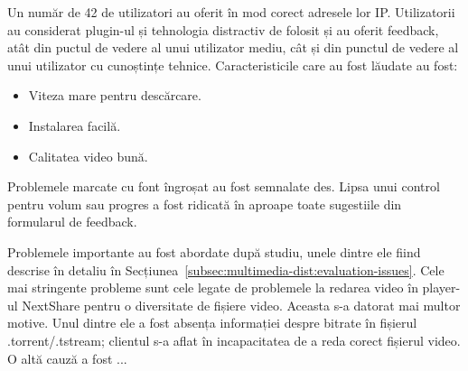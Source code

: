 Un număr de 42 de utilizatori au oferit în mod corect adresele lor IP. Utilizatorii
au considerat plugin-ul și tehnologia distractiv de folosit și au oferit feedback,
atât din puctul de vedere al unui utilizator mediu, cât și din punctul de vedere al
unui utilizator cu cunoștințe tehnice. Caracteristicile care au fost lăudate au fost:
\begin{itemize}
  \item Viteza mare pentru descărcare.
  \item Instalarea facilă.
  \item Calitatea video bună.
\end{itemize}

Problemele marcate cu font îngroșat au fost semnalate des. Lipsa unui control
pentru volum sau progres a fost ridicată în aproape toate sugestiile din
formularul de feedback.

Problemele importante au fost abordate după studiu, unele dintre ele fiind
descrise în detaliu în Secțiunea~\ref{subsec:multimedia-dist:evaluation-issues}.
Cele mai stringente probleme sunt cele legate de problemele la redarea video în
player-ul NextShare pentru o diversitate de fișiere video. Aceasta s-a
datorat mai multor motive. Unul dintre ele a fost absența informației despre
bitrate în fișierul .torrent/.tstream; clientul s-a aflat în incapacitatea de
a reda corect fișierul video. O altă cauză a fost ...

